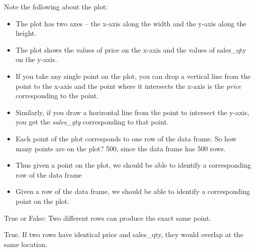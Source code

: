 \documentclass[
  12pt,
  letterpaper,
  DIV=11,
  numbers=noendperiod]{scrreprt}
\providecommand{\tightlist}{%
  \setlength{\itemsep}{0pt}\setlength{\parskip}{0pt}}
\begin{document}
Note the following about the plot:

\begin{itemize}
\tightlist
\item
  The plot has two axes -- the x-axis along the width and the y-axis
  along the height.
\item
  The plot shows the values of price on the x-axis and the values of
  sales\_qty on the y-axis.
\item
  If you take any single point on the plot, you can drop a vertical line
  from the point to the x-axis and the point where it intersects the
  x-axis is the \emph{price} corresponding to the point.
\item
  Similarly, if you draw a horizontal line from the point to intersect
  the y-axis, you get the \emph{sales\_qty} corresponding to that point.
\item
  Each point of the plot corresponds to one row of the data frame. So
  how many points are on the plot? 500, since the data frame has 500
  rows.
\item
  Thus given a point on the plot, we should be able to identify a
  corresponding row of the data frame
\item
  Given a row of the data frame, we should be able to identify a
  corresponding point on the plot.
\end{itemize}

\begin{tcolorbox}[enhanced jigsaw, colback=white, leftrule=.75mm, toprule=.15mm, bottomtitle=1mm, breakable, coltitle=black, toptitle=1mm, title={Quick Check}, opacitybacktitle=0.6, colbacktitle=quarto-callout-note-color!10!white, arc=.35mm, left=2mm, colframe=quarto-callout-note-color-frame, titlerule=0mm, rightrule=.15mm, bottomrule=.15mm, opacityback=0]

True or False: Two different rows can produce the exact same point.

\end{tcolorbox}

\begin{tcolorbox}[enhanced jigsaw, colback=white, leftrule=.75mm, toprule=.15mm, bottomtitle=1mm, breakable, coltitle=black, toptitle=1mm, title={Suggested answer}, opacitybacktitle=0.6, colbacktitle=quarto-callout-note-color!10!white, arc=.35mm, left=2mm, colframe=quarto-callout-note-color-frame, titlerule=0mm, rightrule=.15mm, bottomrule=.15mm, opacityback=0]

True. If two rows have identical price and sales\_qty, they would
overlap at the same location.

\end{tcolorbox}
\end{document}
